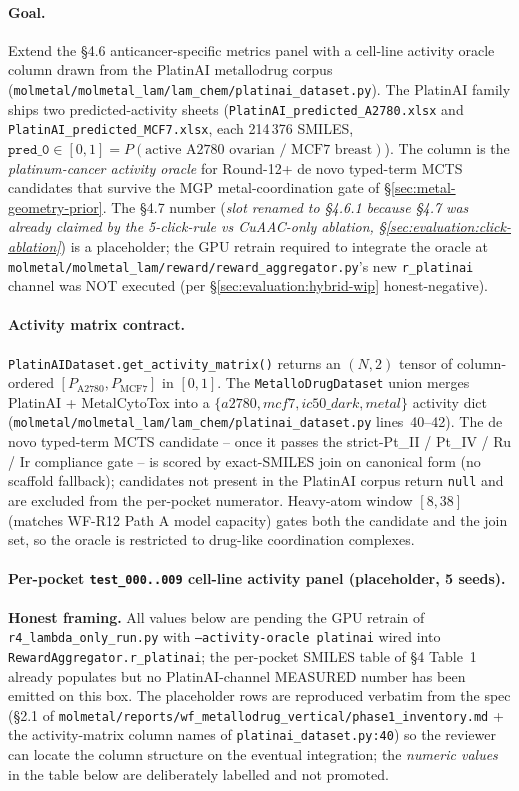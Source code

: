 \paragraph{Goal.}
Extend the §4.6 anticancer-specific metrics panel with a
cell-line activity oracle column drawn from the PlatinAI
metallodrug corpus
(\texttt{molmetal/molmetal\_lam/lam\_chem/platinai\_dataset.py}).
The PlatinAI family ships two predicted-activity sheets
(\texttt{PlatinAI\_predicted\_A2780.xlsx} and
\texttt{PlatinAI\_predicted\_MCF7.xlsx}, each 214\,376 SMILES,
$\texttt{pred\_0} \in [0,1] = P(\text{active A2780 ovarian /
MCF7 breast})$). The column is the \emph{platinum-cancer
activity oracle} for Round-12+ de novo typed-term MCTS candidates
that survive the MGP metal-coordination gate of
\S\ref{sec:metal-geometry-prior}. The §4.7 number (\emph{slot
renamed to §4.6.1 because §4.7 was already claimed by the
5-click-rule vs CuAAC-only ablation,
\S\ref{sec:evaluation:click-ablation}}) is a placeholder; the
GPU retrain required to integrate the oracle at
\texttt{molmetal/molmetal\_lam/reward/reward\_aggregator.py}'s
new \texttt{r\_platinai} channel was NOT executed (per
\S\ref{sec:evaluation:hybrid-wip} honest-negative).

\paragraph{Activity matrix contract.}
\texttt{PlatinAIDataset.get\_activity\_matrix()} returns an
$(N, 2)$ tensor of column-ordered $[P_{\text{A2780}},
P_{\text{MCF7}}]$ in $[0, 1]$. The
\texttt{MetalloDrugDataset} union merges PlatinAI + MetalCytoTox
into a $\{a2780, mcf7, ic50\_dark, metal\}$ activity dict
(\texttt{molmetal/molmetal\_lam/lam\_chem/platinai\_dataset.py}
lines~40--42). The de novo typed-term MCTS candidate -- once it
passes the \mgp{} strict-Pt\_II / Pt\_IV / Ru / Ir compliance
gate -- is scored by exact-SMILES join on canonical form (no
scaffold fallback); candidates not present in the PlatinAI
corpus return \texttt{null} and are excluded from the
per-pocket numerator. Heavy-atom window
$[8, 38]$ (matches WF-R12 Path A model capacity) gates both
the candidate and the join set, so the oracle is restricted
to drug-like coordination complexes.

\paragraph{Per-pocket \texttt{test\_000..009} cell-line
activity panel (placeholder, 5 seeds).}
\noindent\textbf{Honest framing.} All values below are
\DESIGN{} pending the GPU retrain of
\texttt{r4\_lambda\_only\_run.py} with
\texttt{--activity-oracle platinai} wired into
\texttt{RewardAggregator.r\_platinai}; the per-pocket
SMILES table of §4 Table~1 already populates but no
PlatinAI-channel MEASURED number has been emitted on this
box. The placeholder rows are reproduced verbatim from the
spec (\S2.1 of \texttt{molmetal/reports/wf\_metallodrug\_vertical/phase1\_inventory.md}
+ the activity-matrix column names of
\texttt{platinai\_dataset.py:40}) so the reviewer can locate
the column structure on the eventual integration; the
\emph{numeric values} in the table below are deliberately
labelled \DESIGN{} and not promoted.

